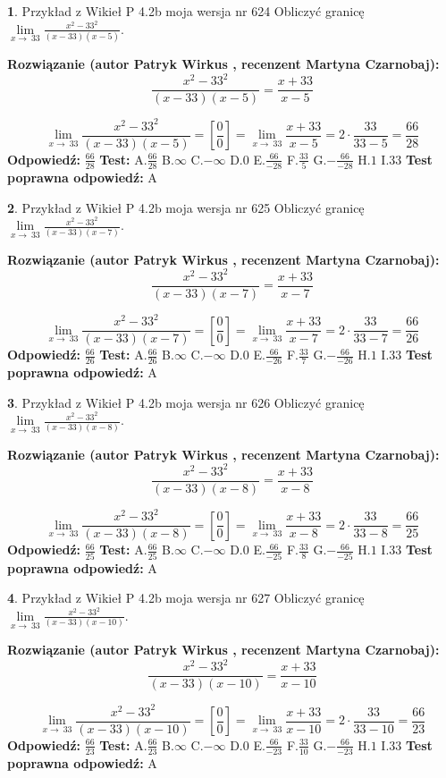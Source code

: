 \documentclass[12pt, a4paper]{article}
\theoremstyle{definition} %
\newtheorem{zad}{}
\newcommand{\zadStart}[1]{\begin{zad}#1\newline}
\newcommand{\zadStop}{\end{zad}}
\newcommand{\rozwStart}[2]{\noindent \textbf{Rozwiązanie (autor #1 , recenzent #2): }\newline}
\newcommand{\rozwStop}{\newline}
\newcommand{\odpStart}{\noindent \textbf{Odpowiedź:}\newline}
\newcommand{\odpStop}{\newline}
\newcommand{\testStart}{\noindent \textbf{Test:}\newline}
\newcommand{\testStop}{\newline}
\newcommand{\kluczStart}{\noindent \textbf{Test poprawna odpowiedź:}\newline}
\newcommand{\kluczStop}{\newline}
\begin{document}
\zadStart{Przykład z Wikieł P 4.2b moja wersja nr 624}
Obliczyć granicę $\lim\limits_{x\to\ 33}\frac{x^{2}-33^{2}}{(x-33)(x-5)}$.
\zadStop
\rozwStart{Patryk Wirkus}{Martyna Czarnobaj}
$$\frac{x^{2}-33^{2}}{(x-33)(x-5)}=\frac{x+33}{x-5}$$

$$\lim\limits_{x\to\ 33}\frac{x^{2}-33^{2}}{(x-33)(x-5)}=[\frac{0}{0}]=\lim\limits_{x\to\ 33}\frac{x+33}{x-5}=2 \cdot \frac{33}{33-5} = \frac{66}{28}$$
\rozwStop
\odpStart
$\frac{66}{28}$
\odpStop
\testStart
A.$\frac{66}{28}$
B.$\infty$
C.$-\infty$
D.$0$
E.$\frac{66}{-28}$
F.$\frac{33}{5}$
G.$-\frac{66}{-28}$
H.$1$
I.$33$
\testStop
\kluczStart
A
\kluczStop



\zadStart{Przykład z Wikieł P 4.2b moja wersja nr 625}
Obliczyć granicę $\lim\limits_{x\to\ 33}\frac{x^{2}-33^{2}}{(x-33)(x-7)}$.
\zadStop
\rozwStart{Patryk Wirkus}{Martyna Czarnobaj}
$$\frac{x^{2}-33^{2}}{(x-33)(x-7)}=\frac{x+33}{x-7}$$

$$\lim\limits_{x\to\ 33}\frac{x^{2}-33^{2}}{(x-33)(x-7)}=[\frac{0}{0}]=\lim\limits_{x\to\ 33}\frac{x+33}{x-7}=2 \cdot \frac{33}{33-7} = \frac{66}{26}$$
\rozwStop
\odpStart
$\frac{66}{26}$
\odpStop
\testStart
A.$\frac{66}{26}$
B.$\infty$
C.$-\infty$
D.$0$
E.$\frac{66}{-26}$
F.$\frac{33}{7}$
G.$-\frac{66}{-26}$
H.$1$
I.$33$
\testStop
\kluczStart
A
\kluczStop



\zadStart{Przykład z Wikieł P 4.2b moja wersja nr 626}
Obliczyć granicę $\lim\limits_{x\to\ 33}\frac{x^{2}-33^{2}}{(x-33)(x-8)}$.
\zadStop
\rozwStart{Patryk Wirkus}{Martyna Czarnobaj}
$$\frac{x^{2}-33^{2}}{(x-33)(x-8)}=\frac{x+33}{x-8}$$

$$\lim\limits_{x\to\ 33}\frac{x^{2}-33^{2}}{(x-33)(x-8)}=[\frac{0}{0}]=\lim\limits_{x\to\ 33}\frac{x+33}{x-8}=2 \cdot \frac{33}{33-8} = \frac{66}{25}$$
\rozwStop
\odpStart
$\frac{66}{25}$
\odpStop
\testStart
A.$\frac{66}{25}$
B.$\infty$
C.$-\infty$
D.$0$
E.$\frac{66}{-25}$
F.$\frac{33}{8}$
G.$-\frac{66}{-25}$
H.$1$
I.$33$
\testStop
\kluczStart
A
\kluczStop



\zadStart{Przykład z Wikieł P 4.2b moja wersja nr 627}
Obliczyć granicę $\lim\limits_{x\to\ 33}\frac{x^{2}-33^{2}}{(x-33)(x-10)}$.
\zadStop
\rozwStart{Patryk Wirkus}{Martyna Czarnobaj}
$$\frac{x^{2}-33^{2}}{(x-33)(x-10)}=\frac{x+33}{x-10}$$

$$\lim\limits_{x\to\ 33}\frac{x^{2}-33^{2}}{(x-33)(x-10)}=[\frac{0}{0}]=\lim\limits_{x\to\ 33}\frac{x+33}{x-10}=2 \cdot \frac{33}{33-10} = \frac{66}{23}$$
\rozwStop
\odpStart
$\frac{66}{23}$
\odpStop
\testStart
A.$\frac{66}{23}$
B.$\infty$
C.$-\infty$
D.$0$
E.$\frac{66}{-23}$
F.$\frac{33}{10}$
G.$-\frac{66}{-23}$
H.$1$
I.$33$
\testStop
\kluczStart
A
\kluczStop
\end{document}
